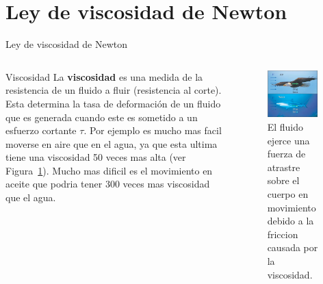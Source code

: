 \documentclass [xcolor=svgnames, t] {beamer}
\begin{document}
\section{Ley de viscosidad de Newton}
\begin{frame}{Ley de viscosidad de Newton}
\vspace{-0.5cm}
\begin{columns}
\begin{block}{Viscosidad}
La \textbf{viscosidad} es una medida de la resistencia de un fluido a fluir (resistencia al corte). Esta determina la tasa de deformaci\'on de un fluido que es generada cuando este es sometido a un esfuerzo cortante $\tau$. Por ejemplo es mucho mas facil moverse en aire que en el agua, ya que esta ultima tiene una viscosidad 50 veces mas alta (ver Figura~\ref{visco0}). Mucho mas dificil es el movimiento en aceite que podria tener 300 veces mas viscosidad que el agua. 
\end{block}
\begin{figure}[h]
\centering
\includegraphics[width=0.9\textwidth]{visco0}
\caption{El fluido ejerce una fuerza de atrastre sobre el cuerpo en movimiento debido a la friccion causada por la viscosidad.}
\label{visco0}
\end{figure}
\end{columns}
\end{frame}
\end{document}
